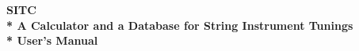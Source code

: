\begin{titlepage}
	\centering\vspace*{\fill}\begin{minipage}{0.5\linewidth}
		\centering
		\hRule
		\vspace*{\baselineskip}
		\bf
		{\huge SITC}\\*
		{\large A Calculator and a Database for String Instrument Tunings}\\*
		{\footnotesize User's Manual}
		\vspace*{\baselineskip}
		\hRule
	\end{minipage}\vspace*{\fill}
\end{titlepage}
